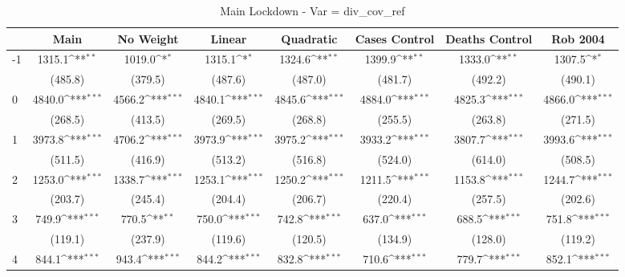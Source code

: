 \documentclass{article}
\begin{document}
{
\def\sym#1{\ifmmode^{#1}\else\(^{#1}\)\fi}
\begin{longtable}{l*{7}{c}}
\caption{Main Lockdown - Var = div\_cov\_ref}\\
\hline\hline\endfirsthead\hline\endhead\hline\endfoot\endlastfoot
                &\multicolumn{1}{c}{Main}&\multicolumn{1}{c}{No Weight}&\multicolumn{1}{c}{Linear}&\multicolumn{1}{c}{Quadratic}&\multicolumn{1}{c}{Cases Control}&\multicolumn{1}{c}{Deaths Control}&\multicolumn{1}{c}{Rob 2004}\\
\hline
-1              &   1315.1\sym{**} &   1019.0\sym{*}  &   1315.1\sym{*}  &   1324.6\sym{**} &   1399.9\sym{**} &   1333.0\sym{**} &   1307.5\sym{*}  \\
                &  (485.8)         &  (379.5)         &  (487.6)         &  (487.0)         &  (481.7)         &  (492.2)         &  (490.1)         \\
0               &   4840.0\sym{***}&   4566.2\sym{***}&   4840.1\sym{***}&   4845.6\sym{***}&   4884.0\sym{***}&   4825.3\sym{***}&   4866.0\sym{***}\\
                &  (268.5)         &  (413.5)         &  (269.5)         &  (268.8)         &  (255.5)         &  (263.8)         &  (271.5)         \\
1               &   3973.8\sym{***}&   4706.2\sym{***}&   3973.9\sym{***}&   3975.2\sym{***}&   3933.2\sym{***}&   3807.7\sym{***}&   3993.6\sym{***}\\
                &  (511.5)         &  (416.9)         &  (513.2)         &  (516.8)         &  (524.0)         &  (614.0)         &  (508.5)         \\
2               &   1253.0\sym{***}&   1338.7\sym{***}&   1253.1\sym{***}&   1250.2\sym{***}&   1211.5\sym{***}&   1153.8\sym{***}&   1244.7\sym{***}\\
                &  (203.7)         &  (245.4)         &  (204.4)         &  (206.7)         &  (220.4)         &  (257.5)         &  (202.6)         \\
3               &    749.9\sym{***}&    770.5\sym{**} &    750.0\sym{***}&    742.8\sym{***}&    637.0\sym{***}&    688.5\sym{***}&    751.8\sym{***}\\
                &  (119.1)         &  (237.9)         &  (119.6)         &  (120.5)         &  (134.9)         &  (128.0)         &  (119.2)         \\
4               &    844.1\sym{***}&    943.4\sym{***}&    844.2\sym{***}&    832.8\sym{***}&    710.6\sym{***}&    779.7\sym{***}&    852.1\sym{***}\\

\end{longtable}}
\end{document}
